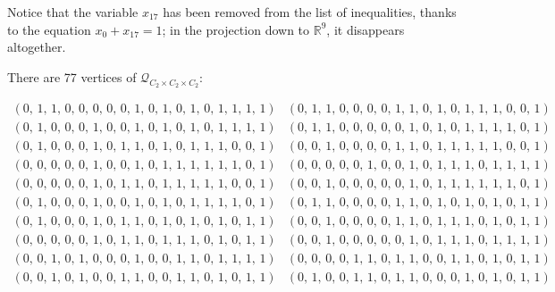 \documentclass[11pt,a4paper,abstract=yes]{scrartcl}
\theoremstyle{plain}
\newcommand{\RR}{\mathbb{R}}
\newcommand{\prpolytope}[1]{\mathcal{Q}_{#1}}
\begin{document}
\begin{mexample}
Notice that the variable \(x_{{17}}\) has been removed from the list of inequalities, thanks to the
equation \(x_{0}+x_{17}=1\); in the projection down to \(\RR^{9}\), it disappears altogether.

There are 77 vertices of \(\prpolytope{C_{2} \times C_{2} \times C_{2}}\):

\label{}
\begin{tiny}\begin{displaymath}\begin{array}{cc}
\left(0,\,1,\,1,\,0,\,0,\,0,\,0,\,0,\,1,\,0,\,1,\,0,\,1,\,0,\,1,\,1,\,1,\,1\right)
 &
\left(0,\,1,\,1,\,0,\,0,\,0,\,0,\,1,\,1,\,0,\,1,\,0,\,1,\,1,\,1,\,0,\,0,\,1\right)
 \\
\left(0,\,1,\,0,\,0,\,0,\,1,\,0,\,0,\,1,\,0,\,1,\,0,\,1,\,0,\,1,\,1,\,1,\,1\right)
 &
\left(0,\,1,\,1,\,0,\,0,\,0,\,0,\,0,\,1,\,0,\,1,\,0,\,1,\,1,\,1,\,1,\,0,\,1\right)
 \\
\left(0,\,1,\,0,\,0,\,0,\,1,\,0,\,1,\,1,\,0,\,1,\,0,\,1,\,1,\,1,\,0,\,0,\,1\right)
 &
\left(0,\,0,\,1,\,0,\,0,\,0,\,0,\,1,\,1,\,0,\,1,\,1,\,1,\,1,\,1,\,0,\,0,\,1\right)
 \\
\left(0,\,0,\,0,\,0,\,0,\,1,\,0,\,0,\,1,\,0,\,1,\,1,\,1,\,1,\,1,\,1,\,0,\,1\right)
 &
\left(0,\,0,\,0,\,0,\,0,\,1,\,0,\,0,\,1,\,0,\,1,\,1,\,1,\,0,\,1,\,1,\,1,\,1\right)
 \\
\left(0,\,0,\,0,\,0,\,0,\,1,\,0,\,1,\,1,\,0,\,1,\,1,\,1,\,1,\,1,\,0,\,0,\,1\right)
 &
\left(0,\,0,\,1,\,0,\,0,\,0,\,0,\,0,\,1,\,0,\,1,\,1,\,1,\,1,\,1,\,1,\,0,\,1\right)
 \\
\left(0,\,1,\,0,\,0,\,0,\,1,\,0,\,0,\,1,\,0,\,1,\,0,\,1,\,1,\,1,\,1,\,0,\,1\right)
 &
\left(0,\,1,\,1,\,0,\,0,\,0,\,0,\,1,\,1,\,0,\,1,\,0,\,1,\,0,\,1,\,0,\,1,\,1\right)
 \\
\left(0,\,1,\,0,\,0,\,0,\,1,\,0,\,1,\,1,\,0,\,1,\,0,\,1,\,0,\,1,\,0,\,1,\,1\right)
 &
\left(0,\,0,\,1,\,0,\,0,\,0,\,0,\,1,\,1,\,0,\,1,\,1,\,1,\,0,\,1,\,0,\,1,\,1\right)
 \\
\left(0,\,0,\,0,\,0,\,0,\,1,\,0,\,1,\,1,\,0,\,1,\,1,\,1,\,0,\,1,\,0,\,1,\,1\right)
 &
\left(0,\,0,\,1,\,0,\,0,\,0,\,0,\,0,\,1,\,0,\,1,\,1,\,1,\,0,\,1,\,1,\,1,\,1\right)
 \\
\left(0,\,0,\,1,\,0,\,1,\,0,\,0,\,0,\,1,\,0,\,0,\,1,\,1,\,0,\,1,\,1,\,1,\,1\right)
 &
\left(0,\,0,\,0,\,0,\,1,\,1,\,0,\,1,\,1,\,0,\,0,\,1,\,1,\,0,\,1,\,0,\,1,\,1\right)
 \\
\left(0,\,0,\,1,\,0,\,1,\,0,\,0,\,1,\,1,\,0,\,0,\,1,\,1,\,0,\,1,\,0,\,1,\,1\right)
 &
\left(0,\,1,\,0,\,0,\,1,\,1,\,0,\,1,\,1,\,0,\,0,\,0,\,1,\,0,\,1,\,0,\,1,\,1\right)

\end{array}
\end{displaymath}
\end{tiny}
\end{mexample}
\end{document}
